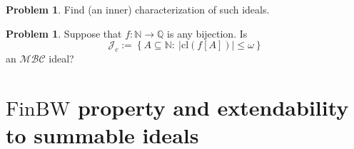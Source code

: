 \documentclass{amsart}
\theoremstyle{definition}
\newtheorem{problem}[thm]{Problem}
\newtheorem{df}[thm]{Definition}
\theoremstyle{definition}
\newcommand{\N}{{\mathbb N}}
\newcommand{\R}{{\mathbb R}}
\newcommand{\Q}{{\mathbb Q}}
\newcommand{\Fin}{\textrm{Fin}}
\newcommand{\I}{\mathcal I}
\newcommand{\J}{\mathcal J}
\newcommand{\finbw}{\text{FinBW}}
\newcommand{\MBC}{\mathcal{MBC}}
\newcommand{\cl}{\mathrm{cl}}
\begin{document}
\begin{problem}
Find (an inner) characterization of such ideals.
\end{problem}

\begin{problem}
Suppose that $f\colon\N\to\Q$ is any bijection. Is 
$$\J_c :=\left\{A\subseteq \N :\ |\cl(f[A])| \leq \omega\right\}$$
an $\MBC$ ideal?
\end{problem}





  
\section{$\finbw$ property and extendability to summable ideals}		


\end{document}
